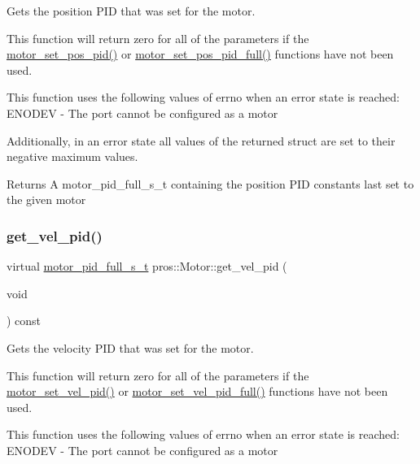 Gets the position P\+ID that was set for the motor. 

This function will return zero for all of the parameters if the \hyperlink{motors_8h_a389e60d01741d5947a9b7330c6c8bbf7}{motor\+\_\+set\+\_\+pos\+\_\+pid()} or \hyperlink{motors_8h_a1d3273573e296507914d2626121f19ce}{motor\+\_\+set\+\_\+pos\+\_\+pid\+\_\+full()} functions have not been used.

This function uses the following values of errno when an error state is reached\+: E\+N\+O\+D\+EV -\/ The port cannot be configured as a motor

Additionally, in an error state all values of the returned struct are set to their negative maximum values.

\begin{DoxyReturn}{Returns}
A motor\+\_\+pid\+\_\+full\+\_\+s\+\_\+t containing the position P\+ID constants last set to the given motor 
\end{DoxyReturn}
\mbox{\label{classpros_1_1Motor_a2b939563c3b915d7b8ce3dd1dece6208}} 
\subsubsection{\texorpdfstring{get\+\_\+vel\+\_\+pid()}{get\_vel\_pid()}}
{\footnotesize\ttfamily virtual \hyperlink{motors_8h_a0295cbf49f5c70c17b5fa962bd25febd}{motor\+\_\+pid\+\_\+full\+\_\+s\+\_\+t} pros\+::\+Motor\+::get\+\_\+vel\+\_\+pid (\begin{DoxyParamCaption}\item[{void}]{ }\end{DoxyParamCaption}) const\hspace{0.3cm}{\ttfamily [virtual]}}



Gets the velocity P\+ID that was set for the motor. 

This function will return zero for all of the parameters if the \hyperlink{motors_8h_a4255880d012ed0ec856f302536755d8a}{motor\+\_\+set\+\_\+vel\+\_\+pid()} or \hyperlink{motors_8h_acdec538d8f08e8b5946294f84f017e8e}{motor\+\_\+set\+\_\+vel\+\_\+pid\+\_\+full()} functions have not been used.

This function uses the following values of errno when an error state is reached\+: E\+N\+O\+D\+EV -\/ The port cannot be configured as a motor

